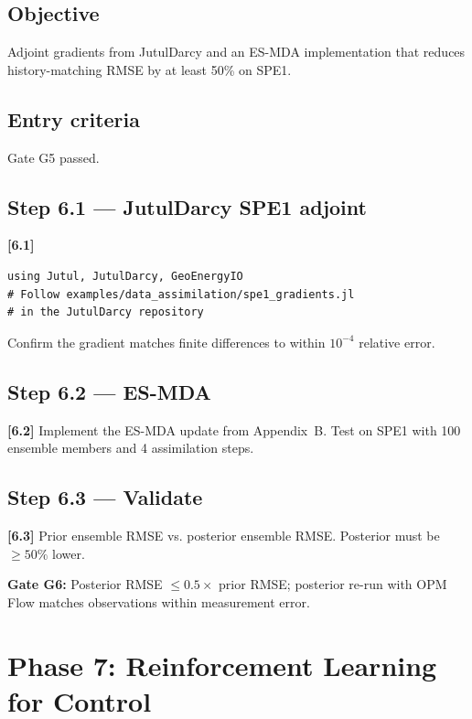 \documentclass[10pt,a4paper]{article}
\newcommand{\stepID}[1]{\textsf{\textbf{[#1]}}}
\begin{document}
\subsection{Objective}
Adjoint gradients from JutulDarcy and an ES-MDA implementation that reduces history-matching RMSE by at least 50\% on SPE1.

\subsection{Entry criteria}
Gate G5 passed.

\subsection{Step 6.1 --- JutulDarcy SPE1 adjoint}

\stepID{6.1}
\begin{lstlisting}[style=jl]
using Jutul, JutulDarcy, GeoEnergyIO
# Follow examples/data_assimilation/spe1_gradients.jl
# in the JutulDarcy repository
\end{lstlisting}

Confirm the gradient matches finite differences to within $10^{-4}$ relative error.

\subsection{Step 6.2 --- ES-MDA}

\stepID{6.2} Implement the ES-MDA update from Appendix~B. Test on SPE1 with 100 ensemble members and 4 assimilation steps.

\subsection{Step 6.3 --- Validate}

\stepID{6.3} Prior ensemble RMSE vs. posterior ensemble RMSE. Posterior must be $\geq 50\%$ lower.

\begin{gate}
\textbf{Gate G6:} Posterior RMSE $\leq 0.5 \times$ prior RMSE; posterior re-run with OPM Flow matches observations within measurement error.
\end{gate}

\section{Phase 7: Reinforcement Learning for Control}
\label{sec:phase7}
\end{document}
